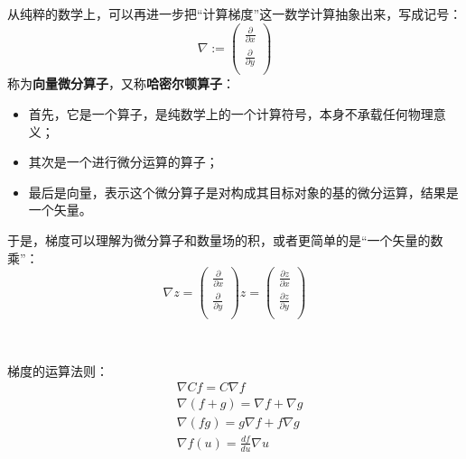 从纯粹的数学上，可以再进一步把“计算梯度”这一数学计算抽象出来，写成记号：
\[
\nabla :=\left( \begin{array}{c}
	\frac{\partial}{\partial x}\\
	\frac{\partial}{\partial y}\\
\end{array} \right)
\]
称为{\bf 向量微分算子}，又称{\bf 哈密尔顿算子}：
\begin{itemize}
    \item 首先，它是一个算子，是纯数学上的一个计算符号，本身不承载任何物理意义；
    \item 其次是一个进行微分运算的算子；
    \item 最后是向量，表示这个微分算子是对构成其目标对象的基的微分运算，结果是一个矢量。
\end{itemize}
于是，梯度可以理解为微分算子和数量场的积，或者更简单的是“一个矢量的数乘”：
\[
\nabla z=\left( \begin{array}{c}
	\frac{\partial}{\partial x}\\
	\frac{\partial}{\partial y}\\
\end{array} \right) z=\left( \begin{array}{c}
	\frac{\partial z}{\partial x}\\
	\frac{\partial z}{\partial y}\\
\end{array} \right)
\]

~

梯度的运算法则：
\begin{align*}
&\nabla Cf=C\nabla f \\
&\nabla \left( f+g \right) =\nabla f+\nabla g \\
&\nabla \left( fg \right) =g\nabla f+f\nabla g \\
&\nabla f\left( u \right) =\frac{df}{du}\nabla u
\end{align*}




